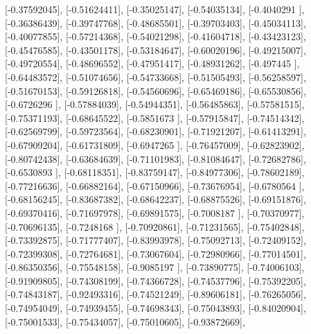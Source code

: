 \documentclass{article}
\begin{document}
       [-0.37592045],
       [-0.51624411],
       [-0.35025147],
       [-0.54035134],
       [-0.4040291 ],
       [-0.36386439],
       [-0.39747768],
       [-0.48685501],
       [-0.39703403],
       [-0.45034113],
       [-0.40077855],
       [-0.57214368],
       [-0.54021298],
       [-0.41604718],
       [-0.43423123],
       [-0.45476585],
       [-0.43501178],
       [-0.53184647],
       [-0.60020196],
       [-0.49215007],
       [-0.49720554],
       [-0.48696552],
       [-0.47951417],
       [-0.48931262],
       [-0.497445  ],
       [-0.64483572],
       [-0.51074656],
       [-0.54733668],
       [-0.51505493],
       [-0.56258597],
       [-0.51670153],
       [-0.59126818],
       [-0.54560696],
       [-0.65469186],
       [-0.65530856],
       [-0.6726296 ],
       [-0.57884039],
       [-0.54944351],
       [-0.56485863],
       [-0.57581515],
       [-0.75371193],
       [-0.68645522],
       [-0.5851673 ],
       [-0.57915847],
       [-0.74514342],
       [-0.62569799],
       [-0.59723564],
       [-0.68230901],
       [-0.71921207],
       [-0.61413291],
       [-0.67909204],
       [-0.61731809],
       [-0.6947265 ],
       [-0.76457009],
       [-0.62823902],
       [-0.80742438],
       [-0.63684639],
       [-0.71101983],
       [-0.81084647],
       [-0.72682786],
       [-0.6530893 ],
       [-0.68118351],
       [-0.83759147],
       [-0.84977306],
       [-0.78602189],
       [-0.77216636],
       [-0.66882164],
       [-0.67150966],
       [-0.73676954],
       [-0.6780564 ],
       [-0.68156245],
       [-0.83687382],
       [-0.68642237],
       [-0.68875526],
       [-0.69151876],
       [-0.69370416],
       [-0.71697978],
       [-0.69891575],
       [-0.7008187 ],
       [-0.70370977],
       [-0.70696135],
       [-0.7248168 ],
       [-0.70920861],
       [-0.71231565],
       [-0.75402848],
       [-0.73392875],
       [-0.71777407],
       [-0.83993978],
       [-0.75092713],
       [-0.72409152],
       [-0.72399308],
       [-0.72764681],
       [-0.73067604],
       [-0.72980966],
       [-0.77014501],
       [-0.86350356],
       [-0.75548158],
       [-0.9085197 ],
       [-0.73890775],
       [-0.74006103],
       [-0.91909805],
       [-0.74308199],
       [-0.74366728],
       [-0.74537796],
       [-0.75392205],
       [-0.74843187],
       [-0.92493316],
       [-0.74521249],
       [-0.89606181],
       [-0.76265056],
       [-0.74954049],
       [-0.74939455],
       [-0.74698343],
       [-0.75043893],
       [-0.84020904],
       [-0.75001533],
       [-0.75434057],
       [-0.75010605],
       [-0.93872669],
\end{document}
